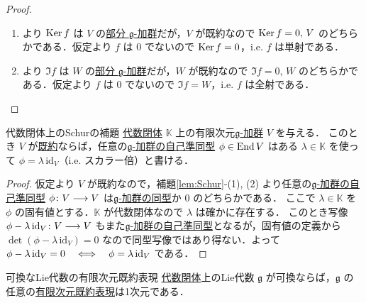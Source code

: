 \documentclass[rep_main]{subfiles}
\begin{document}
\begin{proof}
	\begin{enumerate}
		\item {}より $\operatorname{Ker} f$ は $V$ の\hyperref[def:sub-g-module]{部分 $\mathfrak{g}$-加群}だが，$V$ が既約なので $\operatorname{Ker} f = 0,\, V$ のどちらかである．仮定より $f$ は $0$ でないので $\operatorname{Ker} f = 0$，i.e. $f$ は単射である．
		\item {}より $\Im f$ は $W$ の\hyperref[def:sub-g-module]{部分 $\mathfrak{g}$-加群}だが，$W$ が既約なので $\Im f = 0,\, W$ のどちらかである．仮定より $f$ は $0$ でないので $\Im f = W$，i.e. $f$ は全射である．
	\end{enumerate}
	
\end{proof}

\begin{mycol}[label=col:Schur-closed]{代数閉体上のSchurの補題}
	\underline{代数閉体} $\mathbb{K}$ 上の有限次元\hyperref[ax:g-module]{$\mathfrak{g}$-加群} $V$ を与える．
	このとき $V$ が\hyperref[def:irr]{既約}ならば，任意の\hyperref[def:g-module-hom]{$\mathfrak{g}$-加群の自己準同型} $\phi \in \operatorname{End} V$ はある $\lambda \in \mathbb{K}$ を使って $\phi = \lambda\, \mathrm{id}_V$（i.e. スカラー倍）と書ける．
\end{mycol}

\begin{proof}
	仮定より $V$ が既約なので，補題\ref{lem:Schur}-(1), (2) より任意の\hyperref[def:g-module-hom]{$\mathfrak{g}$-加群の自己準同型} $\phi \colon V \longrightarrow V$ は\hyperref[def:g-module-hom]{$\mathfrak{g}$-加群の同型}か $0$ のどちらかである．
	ここで $\lambda \in \mathbb{K}$ を $\phi$ の固有値とする．$\mathbb{K}$ が代数閉体なので $\lambda$ は確かに存在する．
	このとき写像 $\phi - \lambda\, \mathrm{id}_V \colon V \longrightarrow V$ もまた\hyperref[def:g-module-hom]{$\mathfrak{g}$-加群の自己準同型}となるが，固有値の定義から $\det (\phi - \lambda\, \mathrm{id}_V) = 0$ なので同型写像ではあり得ない．よって $\phi - \lambda\, \mathrm{id}_V = 0 \quad \Longleftrightarrow \quad \phi = \lambda\, \mathrm{id}_V$ である．
\end{proof}

\begin{mycol}[label=col:solvable-irrep]{可換なLie代数の有限次元既約表現}
	\underline{代数閉体}上のLie代数 $\mathfrak{g}$ が可換ならば，$\mathfrak{g}$ の任意の\underline{有限次元}\hyperref[def:irr]{既約表現}は1次元である．
\end{mycol}
\end{document}

